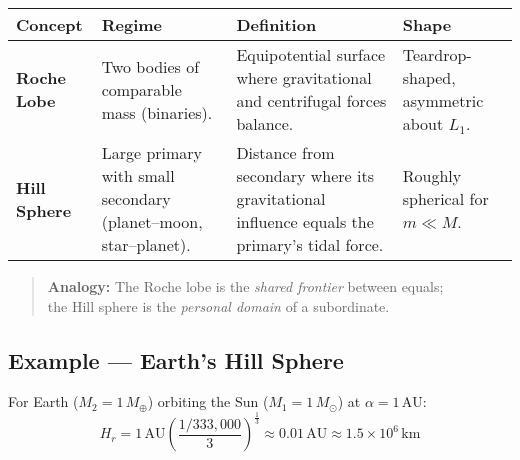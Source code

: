 \documentclass[
  letterpaper,
]{book}
\begin{document}
\begin{longtable}[]{@{}
  >{\raggedright\arraybackslash}p{}
  >{\raggedright\arraybackslash}p{}
  >{\raggedright\arraybackslash}p{}
  >{\raggedright\arraybackslash}p{}@{}}
\toprule\noalign{}
\begin{minipage}[b]{\linewidth}\raggedright
Concept
\end{minipage} & \begin{minipage}[b]{\linewidth}\raggedright
Regime
\end{minipage} & \begin{minipage}[b]{\linewidth}\raggedright
Definition
\end{minipage} & \begin{minipage}[b]{\linewidth}\raggedright
Shape
\end{minipage} \\
\midrule\noalign{}
\endhead
\bottomrule\noalign{}
\endlastfoot
\textbf{Roche Lobe} & Two bodies of comparable mass (binaries). &
Equipotential surface where gravitational and centrifugal forces
balance. & Teardrop-shaped, asymmetric about \(L_1\). \\
\textbf{Hill Sphere} & Large primary with small secondary (planet--moon,
star--planet). & Distance from secondary where its gravitational
influence equals the primary's tidal force. & Roughly spherical for
\(m \ll M\). \\
\end{longtable}

\begin{quote}
\textbf{Analogy:} The Roche lobe is the \emph{shared frontier} between
equals;\\
the Hill sphere is the \emph{personal domain} of a subordinate.
\end{quote}

\subsection{Example --- Earth's Hill
Sphere}\label{example-earths-hill-sphere}

For Earth (\(M_2 = 1\,M_\oplus\)) orbiting the Sun
(\(M_1 = 1\,M_\odot\)) at \(\alpha = 1\,\text{AU}\): \[
H_r = 1\,\text{AU}
       \left(
         \frac{1/333{,}000}{3}
       \right)^{\!\tfrac{1}{3}}
     \approx 0.01\,\text{AU} \approx 1.5\times10^6\,\text{km}
\]
\end{document}
